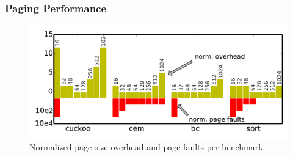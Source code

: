 

\subsubsection{\sys Paging Performance}
\label{sec:results_memory_management}

\begin{figure}
	\centering
	\includegraphics[width=\columnwidth]{figures/pagSizeOverhead}
	\caption{Normalized page size overhead and page faults per benchmark.}
	\label{fig:IPOSPerformance}
	\label{fig:page_size}
\end{figure}

